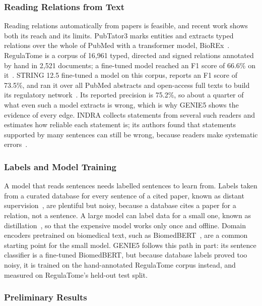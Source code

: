 \documentclass[11pt,a4paper]{article}
\newcommand{\gen}{GENIE5}
\begin{document}
\subsubsection{Reading Relations from Text}

Reading relations automatically from papers is feasible, and recent work shows both its reach and
its limits. PubTator3 marks entities and extracts typed relations over the whole of PubMed with
a transformer model, BioREx~\cite{pubtator3, biorex}. RegulaTome is a corpus of 16,961 typed,
directed and signed relations annotated by hand in 2,521 documents; a fine-tuned model reached an
F1 score of 66.6\% on it~\cite{regulatome}. STRING 12.5 fine-tuned a model on this corpus, reports
an F1 score of 73.5\%, and ran it over all PubMed abstracts and open-access full texts to build its
regulatory network~\cite{string}. Its reported precision is 75.2\%, so about a quarter of what
even such a model extracts is wrong, which is why \gen{} shows the evidence of every edge. INDRA collects statements
from several such readers and estimates how reliable each statement is; its authors found that
statements supported by many sentences can still be wrong, because readers make systematic
errors~\cite{indra, indra2023}.

\subsubsection{Labels and Model Training}

A model that reads sentences needs labelled sentences to learn from. Labels taken from a curated
database for every sentence of a cited paper, known as distant supervision~\cite{mintz}, are
plentiful but noisy, because a database cites a paper for a relation, not a sentence. A large model
can label data for a small one, known as distillation~\cite{hinton}, so that the expensive model
works only once and offline. Domain encoders pretrained on biomedical text, such as
BiomedBERT~\cite{biomedbert}, are a common starting point for the small model. \gen{} follows this
path in part: its sentence classifier is a fine-tuned BiomedBERT, but because database labels
proved too noisy, it is trained on the hand-annotated RegulaTome corpus instead, and measured on
RegulaTome's held-out test split.

\subsubsection{Preliminary Results}\label{sec:prelim}
\end{document}
